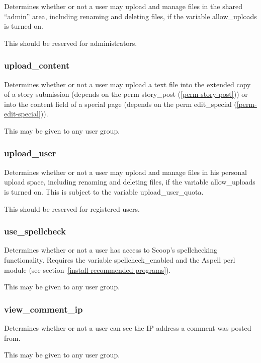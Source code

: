 Determines whether or not a user may upload and manage files in the shared ``admin'' area, including renaming and deleting files, if the variable allow\_uploads is turned on.

This should be reserved for administrators.

\subsubsection{upload\_content}
\label{perm-upload-content}

Determines whether or not a user may upload a text file into the extended copy of a story submission (depends on the perm story\_post (\ref{perm-story-post})) or into the content field of a special page (depends on the perm edit\_special (\ref{perm-edit-special})).

This may be given to any user group.

\subsubsection{upload\_user}
\label{perm-upload-user}

Determines whether or not a user may upload and manage files in his personal upload space, including renaming and deleting files, if the variable allow\_uploads is turned on.  This is subject to the variable upload\_user\_quota.

This should be reserved for registered users.

\subsubsection{use\_spellcheck}
\label{perm-use-spellcheck}

Determines whether or not a user has access to Scoop's spellchecking functionality.  Requires the variable spellcheck\_enabled and the Aspell perl module (see section~\ref{install-recommended-programs}).

This may be given to any user group.

\subsubsection{view\_comment\_ip}
\label{perm-view-comment-ip}

Determines whether or not a user can see the IP address a comment was posted from.

This may be given to any user group.


